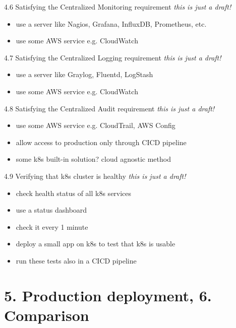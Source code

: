 \documentclass{beamer}
\begin{document}
\begin{frame}{4.6 Satisfying the Centralized Monitoring  requirement}%
\textit{this is just a draft!}
\begin{itemize}
	\item use a server like Nagios, Grafana, InfluxDB, Prometheus, etc.
	\item use some AWS service e.g. CloudWatch
\end{itemize}
\end{frame}

\begin{frame}{4.7 Satisfying the Centralized Logging  requirement}%
\textit{this is just a draft!}
\begin{itemize}
	\item use a server like Graylog, Fluentd, LogStash
	\item use some AWS service e.g. CloudWatch
\end{itemize}
\end{frame}

\begin{frame}{4.8 Satisfying the Centralized Audit requirement}%
\textit{this is just a draft!}
\begin{itemize}
	\item use some AWS service e.g. CloudTrail, AWS Config
	\item allow access to production only through CICD pipeline
	\item some k8s built-in solution? cloud agnostic method
\end{itemize}
\end{frame}

\begin{frame}{4.9 Verifying that k8s cluster is healthy}%
\textit{this is just a draft!}
\begin{itemize}
	\item check health status of all k8s services
	\item use a status dashboard
	\item check it every 1 minute
	\item deploy a small app on k8s to test that k8s is usable
	\item run these tests also in a CICD pipeline
\end{itemize}
\end{frame}

\section{5. Production deployment, 6. Comparison}
\end{document}
